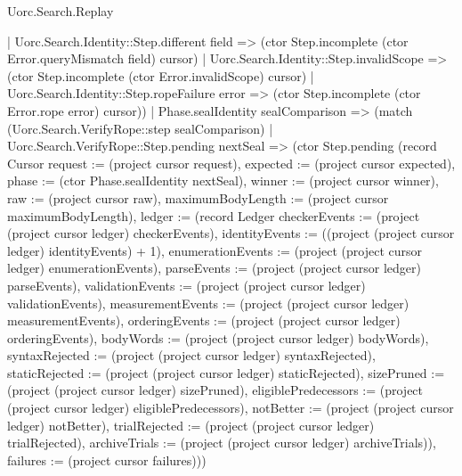 \begin{lexlean}{Uorc.Search.Replay}
\begin{semanticmodule}
{      | Uorc.Search.Identity::Step.different field => (ctor Step.incomplete (ctor Error.queryMismatch field) cursor)
      | Uorc.Search.Identity::Step.invalidScope => (ctor Step.incomplete (ctor Error.invalidScope) cursor)
      | Uorc.Search.Identity::Step.ropeFailure error => (ctor Step.incomplete (ctor Error.rope error) cursor))
    | Phase.sealIdentity sealComparison => (match (Uorc.Search.VerifyRope::step sealComparison)
      | Uorc.Search.VerifyRope::Step.pending nextSeal => (ctor Step.pending (record Cursor {request := (project cursor request), expected := (project cursor expected), phase := (ctor Phase.sealIdentity nextSeal), winner := (project cursor winner), raw := (project cursor raw), maximumBodyLength := (project cursor maximumBodyLength), ledger := (record Ledger {checkerEvents := (project (project cursor ledger) checkerEvents), identityEvents := ((project (project cursor ledger) identityEvents) + 1), enumerationEvents := (project (project cursor ledger) enumerationEvents), parseEvents := (project (project cursor ledger) parseEvents), validationEvents := (project (project cursor ledger) validationEvents), measurementEvents := (project (project cursor ledger) measurementEvents), orderingEvents := (project (project cursor ledger) orderingEvents), bodyWords := (project (project cursor ledger) bodyWords), syntaxRejected := (project (project cursor ledger) syntaxRejected), staticRejected := (project (project cursor ledger) staticRejected), sizePruned := (project (project cursor ledger) sizePruned), eligiblePredecessors := (project (project cursor ledger) eligiblePredecessors), notBetter := (project (project cursor ledger) notBetter), trialRejected := (project (project cursor ledger) trialRejected), archiveTrials := (project (project cursor ledger) archiveTrials)}), failures := (project cursor failures)}))
}
\end{semanticmodule}
\end{lexlean}
